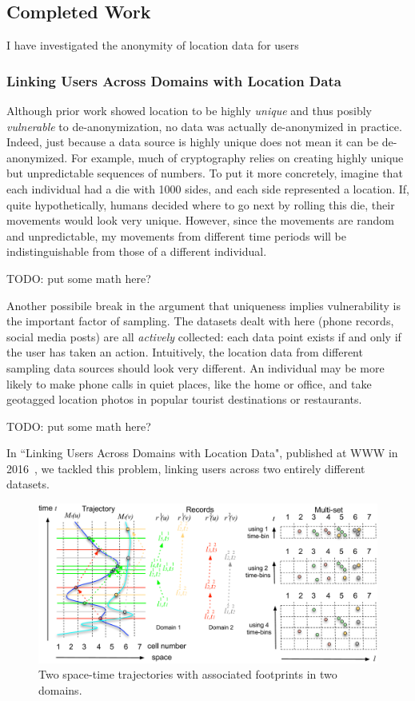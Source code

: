 \subsection{Completed Work}
I have investigated the anonymity of location data for users

\subsubsection{Linking Users Across Domains with Location Data}
Although prior work showed location to be highly \emph{unique} and thus posibly \emph{vulnerable} to de-anonymization, no data was actually de-anonymized in practice.
Indeed, just because a data source is highly unique does not mean it can be de-anonymized.
For example, much of cryptography relies on creating highly unique but unpredictable sequences of numbers.
To put it more concretely, imagine that each individual had a die with 1000 sides, and each side represented a location.
If, quite hypothetically, humans decided where to go next by rolling this die, their movements would look very unique.
However, since the movements are random and unpredictable, my movements from different time periods will be indistinguishable from those of a different individual.

TODO: put some math here?

Another possibile break in the argument that uniqueness implies vulnerability is the important factor of sampling.
The datasets dealt with here (phone records, social media posts) are all \emph{actively} collected: each data point exists if and only if the user has taken an action.
Intuitively, the location data from different sampling data sources should look very different.
An individual may be more likely to make phone calls in quiet places, like the home or office, and take geotagged location photos in popular tourist destinations or restaurants.

TODO: put some math here?

In ``Linking Users Across Domains with Location Data", published at WWW in 2016~\cite{riederer2016linking}, we tackled this problem, linking users across two entirely different datasets.

\begin{figure}[t]
  \begin{center}
    \includegraphics[width=0.65\linewidth]{fig/linking_explain.pdf}
  \end{center}
  \caption{Two space-time trajectories with associated footprints in two domains.}
  \label{fig:linking_explain}
\end{figure}

